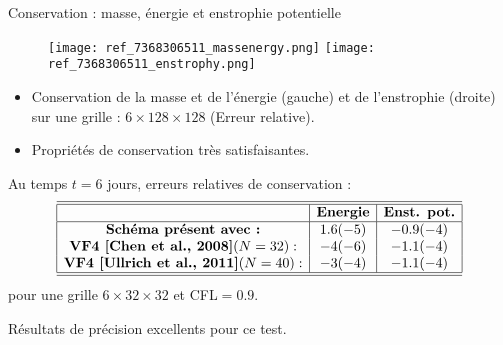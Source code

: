\documentclass[11pt]{beamer}
\begin{document}
\begin{frame}{Conservation : masse, énergie et enstrophie potentielle}
\begin{figure}
\texttt{[image: ref\_7368306511\_massenergy.png]}
\texttt{[image: ref\_7368306511\_enstrophy.png]}
\end{figure}
\begin{itemize}
\item Conservation de la masse et de l'énergie (gauche) et de l'enstrophie (droite) sur une grille : $6 \times 128 \times 128$ (Erreur relative). 

\item Propriétés de conservation très satisfaisantes.
\end{itemize}
\end{frame}







\begin{frame}{}
Au temps $t = 6$ jours, erreurs relatives de conservation :
\begin{equation*}
\begin{array}{|c|c|c|}
\hline
\hline
 & \textbf{Energie} & \textbf{Enst. pot.} \\
\hline
 \textbf{Schéma présent avec :} & 1.6 (-5) &-0.9 (-4) \\
 \textbf{VF4 [Chen et al., 2008]} (N=32) : & -4 (-6) & -1.1 (-4) \\
 \textbf{VF4 [Ullrich et al., 2011]} (N=40) : & -3 (-4) & -1.1 (-4) \\
\hline
\hline
\end{array}
\end{equation*}
pour une grille $6 \times 32 \times 32$ et CFL$=0.9$.

\begin{block}{}
Résultats de précision excellents pour ce test.
\end{block}
\end{frame}
\end{document}
